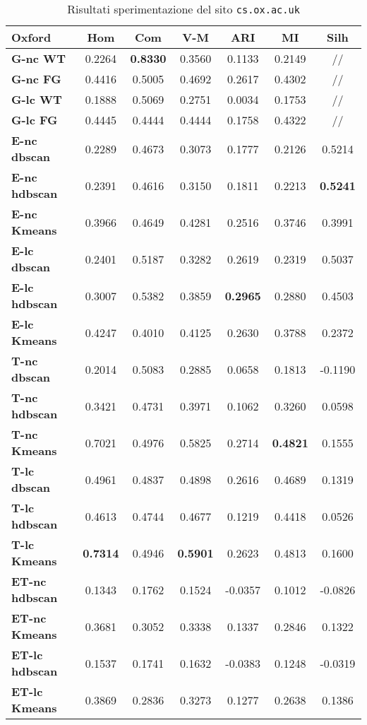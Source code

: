 \begin{table}[H]
	\begin{tabular}{| l | c | c | c | c | c | c |}
	\hline
	\textbf{Oxford}  & \textbf{Hom} & \textbf{Com} & \textbf{V-M}  & \textbf{ARI}  & \textbf{MI} & \textbf{Silh} \\ [2ex] \hline
	\textbf{G-nc WT} & 0.2264 & \textbf{0.8330} & 0.3560 & 0.1133 & 0.2149 & // \\ [2ex]
	 \hline
	\textbf{G-nc FG} & 0.4416 & 0.5005 & 0.4692 & 0.2617 & 0.4302 & // \\ [2ex]
	 \hline	
	\textbf{G-lc WT} & 0.1888 & 0.5069 & 0.2751 & 0.0034 & 0.1753 & // \\ [2ex]
	 \hline	
	\textbf{G-lc FG} & 0.4445 & 0.4444 & 0.4444 & 0.1758 & 0.4322 & // \\ [2ex]
	\hline

	\textbf{E-nc dbscan} & 0.2289 & 0.4673 & 0.3073 & 0.1777 & 0.2126 & 0.5214 \\ [2ex]
	 \hline 
	\textbf{E-nc hdbscan} & 0.2391 & 0.4616 & 0.3150 & 0.1811 & 0.2213 & \textbf{0.5241} \\ [2ex]
	 \hline
	\textbf{E-nc Kmeans} & 0.3966 & 0.4649 & 0.4281 & 0.2516 & 0.3746 & 0.3991 \\ [2ex]
	 \hline	
	\textbf{E-lc dbscan} & 0.2401 & 0.5187 & 0.3282 & 0.2619 & 0.2319 & 0.5037 \\ [2ex]
	\hline
	\textbf{E-lc hdbscan} & 0.3007 & 0.5382 & 0.3859 & \textbf{0.2965} & 0.2880 & 0.4503 \\ [2ex]
	\hline
	\textbf{E-lc Kmeans} & 0.4247 & 0.4010 & 0.4125 & 0.2630 & 0.3788 & 0.2372 \\ [2ex]
	\hline
	
	\textbf{T-nc dbscan} & 0.2014 & 0.5083 & 0.2885 & 0.0658 & 0.1813 & -0.1190 \\ [2ex]
	 \hline 
	\textbf{T-nc hdbscan} & 0.3421 & 0.4731 & 0.3971 & 0.1062 & 0.3260 & 0.0598 \\ [2ex]
	 \hline
	\textbf{T-nc Kmeans} & 0.7021 & 0.4976 & 0.5825 & 0.2714 & \textbf{0.4821} & 0.1555 \\ [2ex]
	 \hline	
	\textbf{T-lc dbscan} & 0.4961 & 0.4837 & 0.4898 & 0.2616 & 0.4689 & 0.1319 \\ [2ex]
	\hline
	\textbf{T-lc hdbscan} & 0.4613 & 0.4744 & 0.4677 & 0.1219 & 0.4418 & 0.0526 \\ [2ex]
	\hline
	\textbf{T-lc Kmeans} & \textbf{0.7314} & 0.4946 & \textbf{0.5901} & 0.2623 & 0.4813 & 0.1600 \\ [2ex]
	\hline
	
	\textbf{ET-nc hdbscan} & 0.1343 & 0.1762 & 0.1524 & -0.0357 & 0.1012 & -0.0826 \\ [2ex]
	 \hline
	\textbf{ET-nc Kmeans} & 0.3681 & 0.3052 & 0.3338 & 0.1337 & 0.2846 & 0.1322 \\ [2ex]
	 \hline	
	\textbf{ET-lc hdbscan} & 0.1537 & 0.1741 & 0.1632 & -0.0383 & 0.1248 & -0.0319 \\ [2ex]
	\hline
	\textbf{ET-lc Kmeans} & 0.3869 & 0.2836 & 0.3273 & 0.1277 & 0.2638 & 0.1386 \\ [2ex]
	\hline
	\end{tabular}
	\caption{Risultati sperimentazione del sito \texttt{cs.ox.ac.uk}}
	\label{metricheOx}
\end{table}

